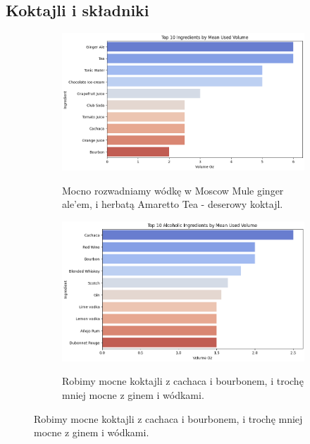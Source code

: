 \documentclass{article}
\begin{document}
\subsection{Koktajli i składniki}
\begin{figure}[ht]
    \centering
    \begin{subfigure}{0.45\textwidth}
        \centering
        \includegraphics[width=\textwidth]{c_i_p_1.png}
        \label{fig:image1}
        \caption{Mocno rozwadniamy wódkę w Moscow Mule ginger ale'em, i herbatą Amaretto Tea - deserowy koktajl.}
    \end{subfigure}
    \hfill
    \begin{subfigure}{0.45\textwidth}
        \centering
        \includegraphics[width=\textwidth]{c_i_p_2.png}
        \label{fig:image2}
        \caption{Robimy mocne koktajli z cachaca i bourbonem, i trochę mniej mocne z ginem i wódkami.}
    \end{subfigure}
    
\end{figure}
\end{document}

